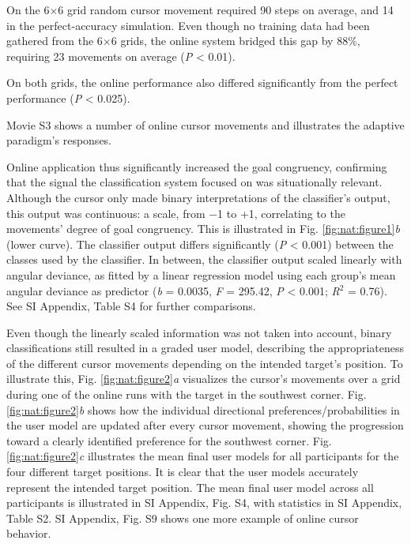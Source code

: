 On the 6$\times$6 grid random cursor movement required 90 steps on average, and 14 in the perfect-accuracy simulation. Even though no training data had been gathered from the 6$\times$6 grids, the online system bridged this gap by 88\%, requiring 23 movements on average (\textit{P} < 0.01).

On both grids, the online performance also differed significantly from the perfect performance (\textit{P} < 0.025).

Movie S3 shows a number of online cursor movements and illustrates the adaptive paradigm's responses.

Online application thus significantly increased the goal congruency, confirming that the signal the classification system focused on was situationally relevant. Although the cursor only made binary interpretations of the classifier's output, this output was continuous: a scale, from −1 to +1, correlating to the movements' degree of goal congruency. This is illustrated in Fig. \ref{fig:nat:figure1}\emph{b} (lower curve). The classifier output differs significantly (\textit{P} < 0.001) between the classes used by the classifier. In between, the classifier output scaled linearly with angular deviance, as fitted by a linear regression model using each group's mean angular deviance as predictor (\textit{b} = 0.0035, \textit{F} = 295.42, \textit{P} < 0.001; \textit{R$^{2}$} = 0.76). See SI Appendix, Table S4 for further comparisons.

Even though the linearly scaled information was not taken into account, binary classifications still resulted in a graded user model, describing the appropriateness of the different cursor movements depending on the intended target's position. To illustrate this, Fig. \ref{fig:nat:figure2}\emph{a} visualizes the cursor's movements over a grid during one of the online runs with the target in the southwest corner. Fig. \ref{fig:nat:figure2}\emph{b} shows how the individual directional preferences/probabilities in the user model are updated after every cursor movement, showing the progression toward a clearly identified preference for the southwest corner. Fig. \ref{fig:nat:figure2}\emph{c} illustrates the mean final user models for all participants for the four different target positions. It is clear that the user models accurately represent the intended target position. The mean final user model across all participants is illustrated in SI Appendix, Fig. S4, with statistics in SI Appendix, Table S2. SI Appendix, Fig. S9 shows one more example of online cursor behavior.


